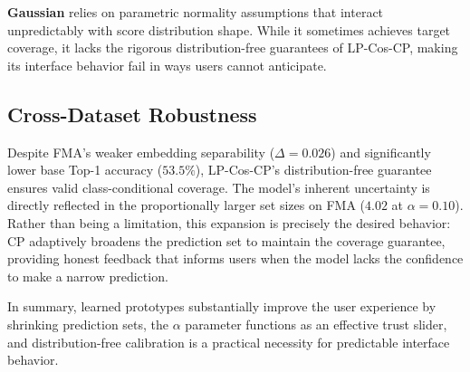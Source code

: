 \textbf{Gaussian} relies on parametric normality assumptions that interact unpredictably with score distribution shape. While it sometimes achieves target coverage, it lacks the rigorous distribution-free guarantees of LP-Cos-CP, making its interface behavior fail in ways users cannot anticipate.

\subsection{Cross-Dataset Robustness}

Despite FMA's weaker embedding separability ($\Delta = 0.026$) and significantly lower base Top-1 accuracy ($53.5\%$), LP-Cos-CP's
distribution-free guarantee ensures valid class-conditional coverage. The model's inherent uncertainty is directly reflected in the
proportionally larger set sizes on FMA ($4.02$ at $\alpha=0.10$).
Rather than being a limitation, this expansion is precisely the desired behavior: CP adaptively broadens the prediction set to maintain the coverage guarantee, providing honest feedback that informs users when the model lacks the confidence to make a narrow prediction.

In summary, learned prototypes substantially improve the user experience by
shrinking prediction sets, the $\alpha$ parameter functions as an effective
trust slider, and distribution-free calibration is a practical necessity for
predictable interface behavior.
